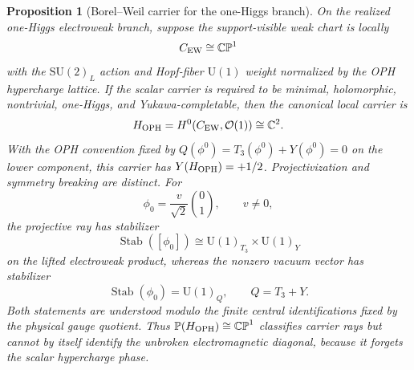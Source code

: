 \documentclass[11pt]{article}
\newtheorem{proposition}[theorem]{Proposition}
\newcommand{\SU}{\mathrm{SU}}
\newcommand{\U}{\mathrm{U}}
\begin{document}
\begin{proposition}[Borel--Weil carrier for the one-Higgs branch]\label{prop:bw-higgs-carrier}
On the realized one-Higgs electroweak branch, suppose the support-visible weak chart is locally
\[
C_{\rm EW}\cong\mathbb{CP}^1
\]
with the \(\SU(2)_L\) action and Hopf-fiber \(\U(1)\) weight normalized by the OPH hypercharge lattice. If the scalar carrier is required to be minimal, holomorphic, nontrivial, one-Higgs, and Yukawa-completable, then the canonical local carrier is
\[
H_{\rm OPH}=H^0(C_{\rm EW},\mathcal O(1))\cong\mathbb C^2.
\]
With the OPH convention fixed by \(Q(\phi^0)=T_3(\phi^0)+Y(\phi^0)=0\) on the lower component, this carrier has \(Y(H_{\rm OPH})=+1/2\). Projectivization and symmetry breaking are distinct. For
\[
\phi_0=\frac{v}{\sqrt2}\binom{0}{1},\qquad v\ne0,
\]
the projective ray has stabilizer
\[
\operatorname{Stab}([\phi_0])
\cong \U(1)_{T_3}\times\U(1)_Y
\]
on the lifted electroweak product, whereas the nonzero vacuum vector has stabilizer
\[
\operatorname{Stab}(\phi_0)=\U(1)_Q,
\qquad Q=T_3+Y.
\]
Both statements are understood modulo the finite central identifications fixed by the physical gauge quotient. Thus \(\mathbb P(H_{\rm OPH})\cong\mathbb{CP}^1\) classifies carrier rays but cannot by itself identify the unbroken electromagnetic diagonal, because it forgets the scalar hypercharge phase.
\end{proposition}
\end{document}
